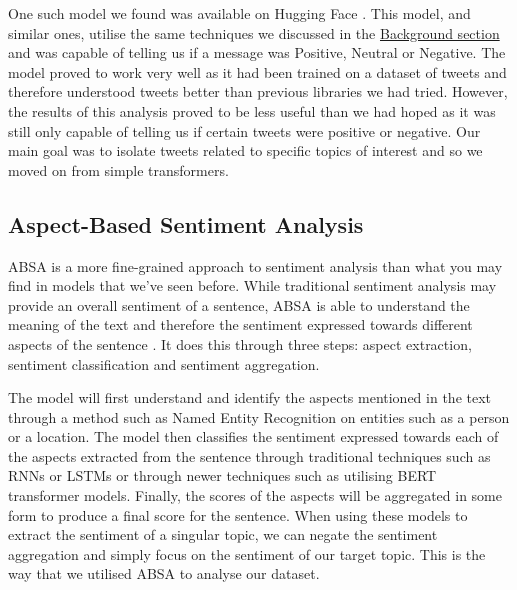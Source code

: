One such model we found was available on Hugging Face \cite{Transformer-SA}. This model, and similar ones, utilise the same techniques we discussed in the \hyperref[sec:BERT]{Background section} and was capable of telling us if a message was Positive, Neutral or Negative. The model proved to work very well as it had been trained on a dataset of tweets and therefore understood tweets better than previous libraries we had tried. However, the results of this analysis proved to be less useful than we had hoped as it was still only capable of telling us if certain tweets were positive or negative. Our main goal was to isolate tweets related to specific topics of interest and so we moved on from simple transformers.

\subsection{Aspect-Based Sentiment Analysis}

ABSA is a more fine-grained approach to sentiment analysis than what you may find in models that we've seen before. While traditional sentiment analysis may provide an overall sentiment of a sentence, ABSA is able to understand the meaning of the text and therefore the sentiment expressed towards different aspects of the sentence \cite{ABSA-paper}. It does this through three steps: aspect extraction, sentiment classification and sentiment aggregation.

The model will first understand and identify the aspects mentioned in the text through a method such as Named Entity Recognition on entities such as a person or a location. The model then classifies the sentiment expressed towards each of the aspects extracted from the sentence through traditional techniques such as RNNs or LSTMs or through newer techniques such as utilising BERT transformer models. Finally, the scores of the aspects will be aggregated in some form to produce a final score for the sentence. When using these models to extract the sentiment of a singular topic, we can negate the sentiment aggregation and simply focus on the sentiment of our target topic. This is the way that we utilised ABSA to analyse our dataset.

